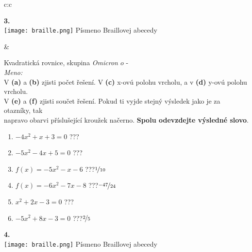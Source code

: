 \documentclass[10pt]{report}
\newcommand\omicron{o}
\begin{document}
\begin{tabular}{c:c}
\begin{minipage}[c][99mm][t]{0.49\linewidth}
\begin{center}
\begin{minipage}{0.20\linewidth}
\begin{center}
{\Huge\bfseries 3.} \\[2mm]
\texttt{[image: braille.png]}
{\small Písmeno Braillovej abecedy}
\end{center}
\end{minipage}
\end{center}
\end{minipage}
&
\begin{minipage}[c][99mm][t]{0.49\linewidth}
\begin{center}
\vspace{7mm}
{\huge Kvadratická rovnice, skupina \textit{Omicron $\omicron$} -}\\[4.5mm]
\textit{Meno:}\phantom{xxxxxxxxxxxxxxxxxxxxxxxxxxxxxxxxxxxxxxxxxxxxxxxxxxxxxxxxxxxxxxxxx}\\[3.5mm]
V \textbf{(a)} a \textbf{(b)} zjisti počet řešení. V \textbf{(c)} x-ovú polohu vrcholu, a v \textbf{(d)} y-ovú polohu vrcholu.\\V \textbf{(e)} a \textbf{(f)} zjisti součet řešení. Pokud ti vyjde stejný výsledek jako je za otazníky, tak\\napravo obarvi příslušející kroužek načerno. \textbf{Spolu odevzdejte výsledné slovo}.\\[3mm]
\begin{minipage}{0.77\linewidth}
\begin{center}
\begin{varwidth}{\textwidth}
\begin{enumerate}
\large
\item $-4x^2+x+3=0$\quad \dotfill\; ???\;\dotfill {}
\item $-5x^2-4x+5=0$\quad \dotfill\; ???\;\dotfill {}
\item $f(x)=-5x^2-x-6$\quad \dotfill\; ???\;\dotfill \quad $\nicefrac{1}{10}$
\item $f(x)=-6x^2-7x-8$\quad \dotfill\; ???\;\dotfill \quad $\nicefrac{-47}{24}$
\item $x^2+2x-3=0$\quad \dotfill\; ???\;\dotfill {}
\item $-5x^2+8x-3=0$\quad \dotfill\; ???\;\dotfill \quad $\nicefrac{2}{5}$
\end{enumerate}
\end{varwidth}
\end{center}
\end{minipage}
\begin{minipage}{0.20\linewidth}
\begin{center}
{\Huge\bfseries 4.} \\[2mm]
\texttt{[image: braille.png]}
{\small Písmeno Braillovej abecedy}
\end{center}
\end{minipage}
\end{center}
\end{minipage}

\end{tabular}
\end{document}

